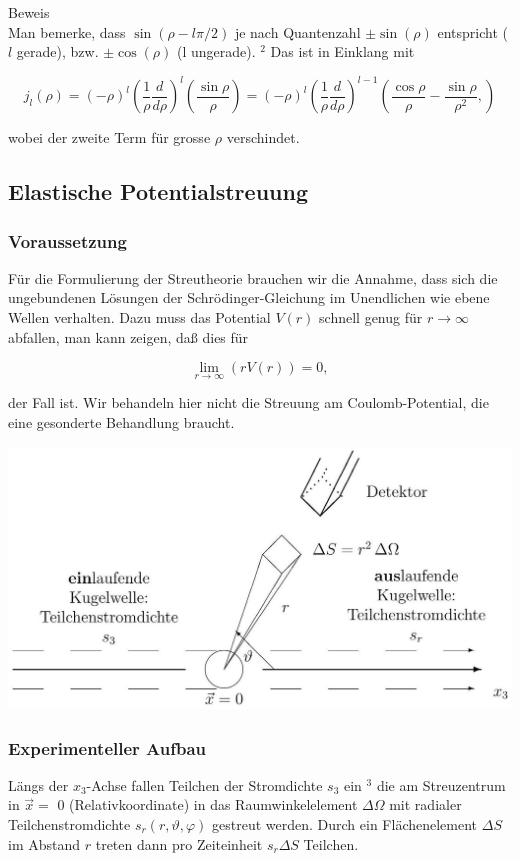 \documentclass[10pt, letterpaper]{article}
\begin{document}
Beweis\\
Man bemerke, dass $\sin (\rho-l \pi / 2)$ je nach Quantenzahl $\pm \sin (\rho)$ entspricht ( $l$ gerade), bzw. $\pm \cos (\rho)$ (l ungerade). ${ }^{2}$ Das ist in Einklang mit

$$
j_{l}(\rho)=(-\rho)^{l}\left(\frac{1}{\rho} \frac{d}{d \rho}\right)^{l}\left(\frac{\sin \rho}{\rho}\right)=(-\rho)^{l}\left(\frac{1}{\rho} \frac{d}{d \rho}\right)^{l-1}\left(\frac{\cos \rho}{\rho}-\frac{\sin \rho}{\rho^{2}},\right)
$$

wobei der zweite Term für grosse $\rho$ verschindet.

\subsection*{Elastische Potentialstreuung}
\subsubsection*{Voraussetzung}
Für die Formulierung der Streutheorie brauchen wir die Annahme, dass sich die ungebundenen Lösungen der Schrödinger-Gleichung im Unendlichen wie ebene Wellen verhalten. Dazu muss das Potential $V(r)$ schnell genug für $r \rightarrow \infty$ abfallen, man kann zeigen, daß dies für

$$
\lim _{r \rightarrow \infty}(r V(r))=0,
$$

der Fall ist. Wir behandeln hier nicht die Streuung am Coulomb-Potential, die eine gesonderte Behandlung braucht.

\includegraphics[scale=0.2, center]{2025_05_21_d5590f158a899e385c7cg-13}

\subsubsection*{Experimenteller Aufbau}
Längs der $x_{3}$-Achse fallen Teilchen der Stromdichte $s_{3}$ ein ${ }^{3}$ die am Streuzentrum in $\vec{x}=$ 0 (Relativkoordinate) in das Raumwinkelelement $\Delta \Omega$ mit radialer Teilchenstromdichte $s_{r}(r, \vartheta, \varphi)$ gestreut werden. Durch ein Flächenelement $\Delta S$ im Abstand $r$ treten dann pro Zeiteinheit $s_{r} \Delta S$ Teilchen.
\end{document}
